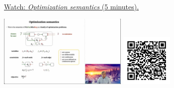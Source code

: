 
\begin{minipage}{10cm}
    \href{https://act4e-spring21.netlify.app/videos/spring2021-functorial-comp-a:optimization-semantics.html}{Watch: \emph{Optimization semantics} (5 minutes).}
        
    \href{https://act4e-spring21.netlify.app/videos/spring2021-functorial-comp-a:optimization-semantics.html}{\includegraphics[height=3.5cm]{spring2021-functorial-comp-a:optimization-semantics/thumbnails.jpg}}
    \href{https://act4e-spring21.netlify.app/videos/spring2021-functorial-comp-a:optimization-semantics.html}{\includegraphics[height=2.5cm]{spring2021-functorial-comp-a:optimization-semantics/qrcode.png}}
\end{minipage}
